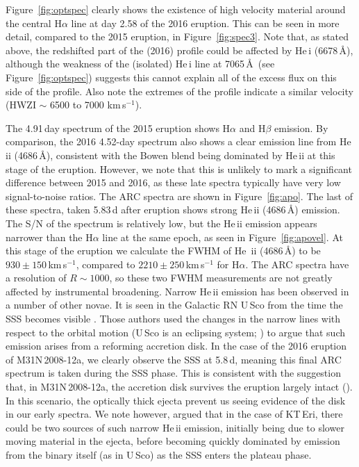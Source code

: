 \documentclass[twocolumn,tighten]{aastex6}
\def\novak{{M31N\,2008-12a}}
\newcommand{\hstphot}{\citetalias{2017ApJ...849...96D}}
\begin{document}
Figure~\ref{fig:optspec} clearly shows the existence of high velocity material around the central H$\alpha$ line at day 2.58 of the 2016 eruption. This can be seen in more detail, compared to the 2015 eruption, in Figure~\ref{fig:spec3}. Note that, as stated above, the redshifted part of the (2016) profile could be affected by He\,{\sc i} (6678\,\AA), although the weakness of the (isolated) He\,{\sc i} line at 7065\,\AA\ (see Figure~\ref{fig:optspec}) suggests this cannot explain all of the excess flux on this side of the profile. Also note the extremes of the profile indicate a similar velocity (HWZI $\sim$ 6500 to 7000 km\,s$^{-1}$).

The 4.91\,day spectrum of the 2015 eruption shows H$\alpha$ and H$\beta$ emission.  By comparison, the 2016 4.52-day spectrum also shows a clear emission line from He\,{\sc ii} (4686\,\AA), consistent with the Bowen blend being dominated by He\,{\sc ii} at this stage of the eruption.  However, we note that this is unlikely to mark a significant difference between 2015 and 2016, as these late spectra typically have very low signal-to-noise ratios. The ARC spectra are shown in Figure~\ref{fig:apo}. The last of these spectra, taken 5.83\,d after eruption shows strong He\,{\sc ii} (4686\,\AA) emission. The S/N of the spectrum is relatively low, but the He\,{\sc ii} emission appears narrower than the H$\alpha$ line at the same epoch, as seen in Figure~\ref{fig:apovel}. At this stage of the eruption we calculate the FWHM of He~{\sc ii} (4686\,\AA) to be $930\pm150$\,km\,s$^{-1}$, compared to $2210\pm250$\,km\,s$^{-1}$ for H$\alpha$. The ARC spectra have a resolution of $R\sim1000$, so these two FWHM measurements are not greatly affected by instrumental broadening. Narrow He\,{\sc ii} emission has been observed in a number of other novae. It is seen in the Galactic RN U\,Sco from the time the SSS becomes visible \citep{2012A&A...544A.149M}. Those authors used the changes in the narrow lines with respect to the orbital motion (U\,Sco is an eclipsing system; \citealp{1990ApJ...355L..39S}) to argue that such emission arises from a reforming accretion disk. In the case of the 2016 eruption of \novak, we clearly observe the SSS at 5.8\,d, meaning this final ARC spectrum is taken during the SSS phase. This is consistent with the suggestion that, in \novak, the accretion disk survives the eruption largely intact (\hstphot). In this scenario, the optically thick ejecta prevent us seeing evidence of the disk in our early spectra. We note however, \citet{2014A&A...564A..76M} argued that in the case of KT\,Eri, there could be two sources of such narrow He\,{\sc ii} emission, initially being due to slower moving material in the ejecta, before becoming quickly dominated by emission from the binary itself (as in U\,Sco) as the SSS enters the plateau phase.
\end{document}
